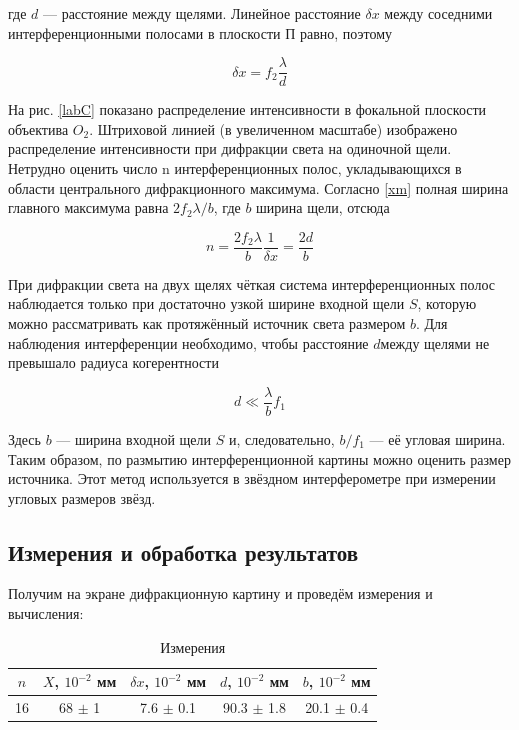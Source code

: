 \documentclass[a4paper,12pt]{article}
\begin{document}
где $ d $ --- расстояние между щелями. Линейное расстояние $ \delta x $ между соседними интерференционными полосами в плоскости П равно, поэтому

\begin{equation}\label{dx}
\delta x = f_2 \dfrac{\lambda}{d}
\end{equation}

На рис. \ref{labC} показано распределение интенсивности в фокальной плоскости объектива $ O_2 $. Штриховой линией (в увеличенном масштабе)
изображено распределение интенсивности при дифракции света на одиночной щели. Нетрудно оценить число n интерференционных полос,
укладывающихся в области центрального дифракционного максимума.
Согласно \eqref{xm} полная ширина главного максимума равна $ 2 f_2 \lambda /b $, где $ b $ ширина щели, отсюда

\begin{equation}\label{n}
n = \dfrac{2f_2 \lambda}{b} \dfrac{1}{\delta x} = \dfrac{2d}{b}
\end{equation}

При дифракции света на двух щелях чёткая система интерференционных полос наблюдается только при достаточно узкой ширине входной щели $ S $, которую можно рассматривать как протяжённый источник света размером $ b $. Для наблюдения интерференции необходимо, чтобы расстояние $ d $между щелями не превышало радиуса когерентности

\begin{equation}\label{}
d \ll \dfrac{\lambda}{b} f_1
\end{equation}

Здесь $ b $ --- ширина входной щели $ S $ и, следовательно, $  b/f_1 $ --- её угловая ширина. Таким образом, по размытию интерференционной картины можно оценить размер источника. Этот метод используется в звёздном интерферометре при измерении угловых размеров звёзд.

\subsection{Измерения и обработка результатов}

Получим на экране дифракционную картину и проведём измерения и вычисления:

\begin{table}[h!]
	\centering
	\caption{Измерения}
	\begin{tabular}{|c|c|c|c|c|} \hline
		$n$ &	$X$, $ 10^{-2} $ мм &	$\delta x$, $ 10^{-2} $ мм& $d$, $ 10^{-2} $ мм & $b$, $ 10^{-2} $ мм \\
		\hline
		16	&	68 $\pm$ 1  & 7.6 $\pm$ 0.1 &	90.3 $\pm$ 1.8 &	20.1 $\pm$ 0.4 \\ \hline
	\end{tabular}   
\end{table}
\end{document}
